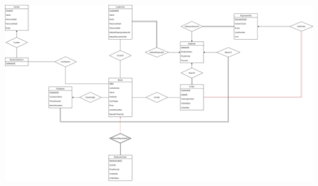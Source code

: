\documentclass{article}
\begin{document}
\begin{landscape}
\includegraphics[height=\textwidth]{er}
\end{landscape}
\end{document}
